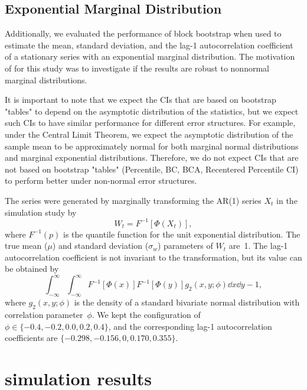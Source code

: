 \documentclass[10pt]{article}
\begin{document}
\subsection*{Exponential Marginal Distribution}
Additionally, we evaluated the performance of block bootstrap when used to 
estimate
the mean, standard deviation, and the lag-1 autocorrelation coefficient of a
stationary series with an exponential marginal distribution. The motivation of
for this study was to investigate if the results are robust to nonnormal
marginal distributions.

It is important to note that we expect the CIs that are based on bootstrap 
"tables" to depend on the 
asymptotic distribution of the statistics, but we expect such CIs to 
have similar performance for different error structures. For example, under the 
Central
Limit Theorem, we expect the asymptotic distribution of the sample mean to be 
approximately 
normal for both marginal normal distributions and marginal exponential 
distributions. Therefore, we do not expect CIs that are not based on bootstrap
"tables" (Percentile, BC, BCA, Recentered Percentile CI) to perform better under
non-normal error structures.

The series were generated by marginally transforming the
AR(1) series $X_t$ in the simulation study by
\begin{equation*}
W_t = F^{-1}[\Phi(X_t)],
\end{equation*}
where $F^{-1}(p)$ is the quantile function for the unit exponential 
distribution. The true mean ($\mu$) and standard deviation ($\sigma_w$) 
parameters 
of $W_t$ are~1. The 
lag-1
autocorrelation coefficient is not invariant to the
transformation, \citep{hofert2018elements} but its value can be obtained by
\begin{equation*}
\int_{-\infty}^\infty \int_{-\infty}^\infty F^{-1}[\Phi(x)] F^{-1}[\Phi(y)] g_2(x, y; \phi) \dd x \dd y - 1,
\end{equation*}
where $g_2(x, y; \phi)$ is the density of a standard bivariate normal
distribution with correlation parameter~$\phi$. We kept the configuration of
$\phi \in \{-0.4, -0.2, 0.0, 0.2, 0.4\}$, and the corresponding lag-1
autocorrelation coefficients are $\{-0.298, -0.156, \allowbreak 0, 0.170, 0.355\}$.

\section*{simulation results}
\label{sec:simres}
\end{document}
